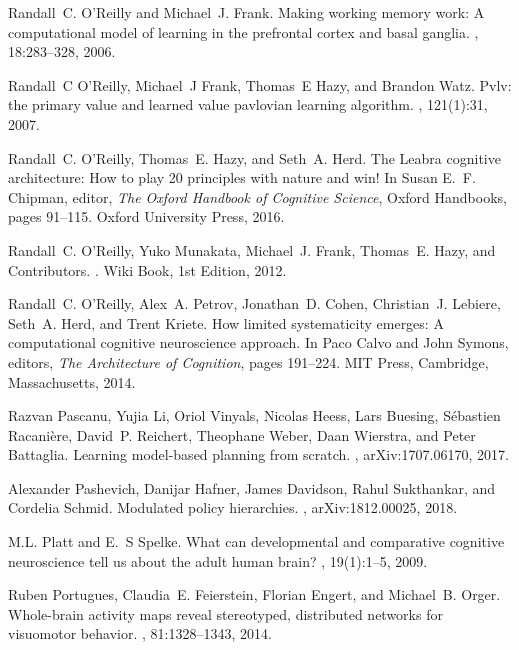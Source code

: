 \documentclass[letterpaper,11pt]{article}
\begin{document}
\begin{thebibliography}{100}
Randall~C. O'Reilly and Michael~J. Frank.
\newblock Making working memory work: A computational model of learning in the
  prefrontal cortex and basal ganglia.
, 18:283--328, 2006.

Randall~C O'Reilly, Michael~J Frank, Thomas~E Hazy, and Brandon Watz.
\newblock Pvlv: the primary value and learned value pavlovian learning
  algorithm.
, 121(1):31, 2007.

Randall~C. O'Reilly, Thomas~E. Hazy, and Seth~A. Herd.
\newblock The {Leabra} cognitive architecture: {H}ow to play 20 principles with
  nature and win!
\newblock In Susan E.~F. Chipman, editor, {\em The Oxford Handbook of Cognitive
  Science}, Oxford Handbooks, pages 91--115. Oxford University Press, 2016.

Randall~C. O'Reilly, Yuko Munakata, Michael~J. Frank, Thomas~E. Hazy, and
  Contributors.
.
\newblock Wiki Book, 1st Edition, 2012.

Randall~C. O'Reilly, Alex~A. Petrov, Jonathan~D. Cohen, Christian~J. Lebiere,
  Seth~A. Herd, and Trent Kriete.
\newblock How limited systematicity emerges: A computational cognitive
  neuroscience approach.
\newblock In Paco Calvo and John Symons, editors, {\em The Architecture of
  Cognition}, pages 191--224. MIT Press, Cambridge, Massachusetts, 2014.

Razvan Pascanu, Yujia Li, Oriol Vinyals, Nicolas Heess, Lars Buesing,
  S{\'{e}}bastien Racani{\`{e}}re, David~P. Reichert, Theophane Weber, Daan
  Wierstra, and Peter Battaglia.
\newblock Learning model-based planning from scratch.
, arXiv:1707.06170, 2017.

Alexander Pashevich, Danijar Hafner, James Davidson, Rahul Sukthankar, and
  Cordelia Schmid.
\newblock Modulated policy hierarchies.
, arXiv:1812.00025, 2018.

M.L. Platt and E.~S Spelke.
\newblock What can developmental and comparative cognitive neuroscience tell us
  about the adult human brain?
, 19(1):1--5, 2009.

Ruben Portugues, Claudia~E. Feierstein, Florian Engert, and Michael~B. Orger.
\newblock Whole-brain activity maps reveal stereotyped, distributed networks
  for visuomotor behavior.
, 81:1328--1343, 2014.


\end{thebibliography}
\end{document}

